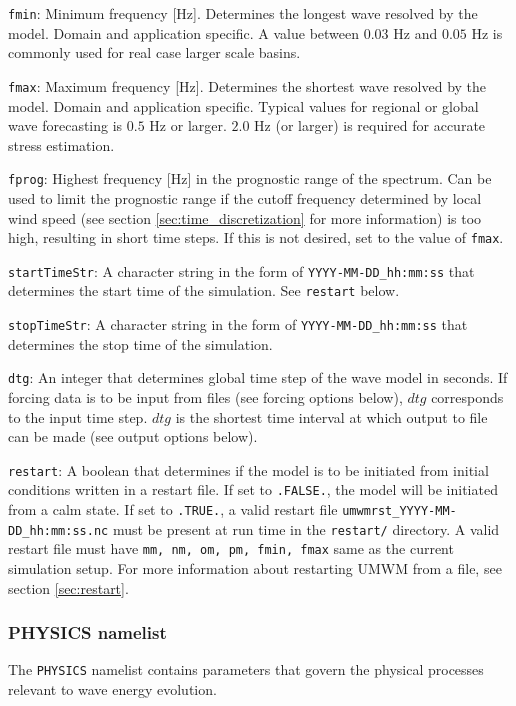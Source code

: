 \documentclass[letterpaper]{article}
\numberwithin{equation}{section}
\begin{document}
\verb+fmin+:
Minimum frequency [Hz].
Determines the longest wave resolved by the model. 
Domain and application specific.
A value between $0.03$ Hz and $0.05$ Hz is commonly used
for real case larger scale basins.
 
\verb+fmax+:
Maximum frequency [Hz].
Determines the shortest wave resolved by the model.
Domain and application specific.
Typical values for regional or global wave forecasting is $0.5$ Hz or larger. 
$2.0$ Hz (or larger) is required for accurate stress estimation.

\verb+fprog+:
Highest frequency [Hz] in the prognostic range of the spectrum.
Can be used to limit the prognostic range if the cutoff frequency
determined by local wind speed 
(see section \ref{sec:time_discretization} for more information)
is too high, resulting in short time steps.
If this is not desired, set to the value of \verb+fmax+. 

\verb+startTimeStr+:
A character string in the form of \verb+YYYY-MM-DD_hh:mm:ss+ that determines
the start time of the simulation.
See \verb+restart+ below.

\verb+stopTimeStr+:
A character string in the form of \verb+YYYY-MM-DD_hh:mm:ss+ that determines
the stop time of the simulation.

\verb+dtg+:
An integer that determines global time step of the wave model in seconds.
If forcing data is to be input from files (see forcing options below),
$dtg$ corresponds to the input time step. 
$dtg$ is the shortest time interval at which output to file can be made
(see output options below).

\verb+restart+:
A boolean that determines if the model is to be initiated 
from initial conditions written in a restart file.
If set to \verb+.FALSE.+, the model will be initiated from a calm state.
If set to \verb+.TRUE.+, a valid restart file \verb+umwmrst_YYYY-MM-DD_hh:mm:ss.nc+
must be present at run time in the \verb+restart/+ directory.
A valid restart file must have \verb+mm, nm, om, pm, fmin, fmax+ 
same as the current simulation setup.
For more information about restarting UMWM from a file, see section \ref{sec:restart}.



\subsubsection{PHYSICS namelist}
\label{sec:physics_namelist}

The \verb+PHYSICS+ namelist contains parameters that govern
the physical processes relevant to wave energy evolution.
\end{document}
